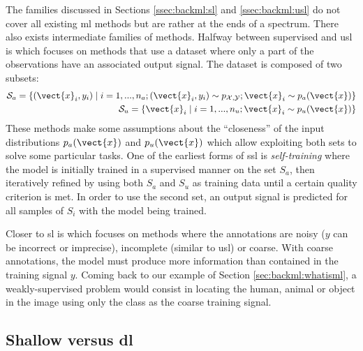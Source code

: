 The families discussed in Sections \ref{ssec:backml:sl} and \ref{ssec:backml:usl}
do not cover all existing \acrlong{ml} methods but are rather at the ends of a
spectrum. There also exists intermediate families of methods. Halfway between
supervised and \acrlong{usl} is  which focuses on methods that
use a dataset where only a part of the observations have an associated output
signal. The dataset is composed of two subsets:
\begin{eqnarray}
\mathcal{S}_a = \left\{(\vect{x}_i, y_i) \mid i = 1,...,n_a; (\vect{x}_i, y_i) \sim p_{\mathcal{X},\mathcal{Y}}; \vect{x}_i \sim p_a(\vect{x})\right\} \\
\mathcal{S}_u = \left\{\vect{x}_i \mid i = 1,...,n_u; \vect{x}_i \sim p_u(\vect{x})\right\}
\end{eqnarray}
These methods make some assumptions about the ``closeness'' of the input distributions
$p_a(\vect{x})$ and $p_u(\vect{x})$ \parencite{chapelle2006semi} which allow
exploiting both sets to solve some particular tasks. One of the earliest forms of
\acrlong{ssl} is \textit{self-training} \parencite{scudder1965probability} where
the model is initially trained in a supervised manner on the set $S_a$, then
iteratively refined by using both $S_a$ and $S_u$ as training data until a certain
quality criterion is met. In order to use the second set, an output signal is
predicted for all samples of $S_i$ with the model being trained.

Closer to \acrlong{sl} is  which focuses on methods where the
annotations are noisy (\eg $y$ can be incorrect or imprecise), incomplete (similar
to \acrlong{usl}) or coarse. With coarse annotations, the model must produce more
information than contained in the training signal $y$. Coming back to our example
of Section \ref{sec:backml:whatisml}, a weakly-supervised problem would consist
in locating the human, animal or object in the image using only the class as the
coarse training signal.

\subsection{Shallow versus \acrlong{dl}}
\label{ssec:backml:shallowdeep}

